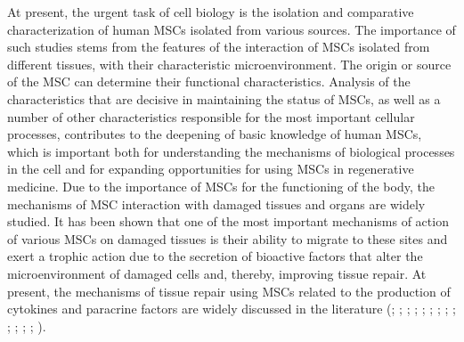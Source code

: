 \documentclass[alpha-refs]{wiley-article}
\begin{document}
At present, the urgent task of cell biology is the isolation and comparative characterization of human MSCs isolated from various sources.
The importance of such studies stems from the features of the interaction of MSCs isolated from different tissues, with their characteristic microenvironment.
The origin or source of the MSC can determine their functional characteristics.
Analysis of the characteristics that are decisive in maintaining the status of MSCs, as well as a number of other characteristics responsible for the most important cellular processes, contributes to the deepening of basic knowledge of human MSCs, which is important both for understanding the mechanisms of biological processes in the cell and for expanding opportunities for using MSCs in regenerative medicine.
Due to the importance of MSCs for the functioning of the body, the mechanisms of MSC interaction with damaged tissues and organs are widely studied.
It has been shown that one of the most important mechanisms of action of various MSCs on damaged tissues is their ability to migrate to these sites and exert a trophic action due to the secretion of bioactive factors that alter the microenvironment of damaged cells and, thereby, improving tissue repair.
At present, the mechanisms of tissue repair using MSCs related to the production of cytokines and paracrine factors are widely discussed in the literature (\cite{phinney2007concise}; \cite{m2011mesenchymal}; \cite{guiducci2011bone}; \cite{gruenloh2011characterization}; \cite{huang2013effects}; \cite{luo2013mesenchymal}; \cite{ando2014stem}; \cite{hendijani2015human}; \cite{hendijani2015effect}; \cite{danieli2016testing}; \cite{julianto2016topical}; \cite{teixeira2017impact}; \cite{vulcano2016wharton}; \cite{zachar2016activation}).
\end{document}
